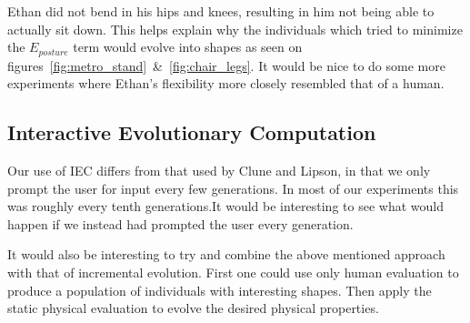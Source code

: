 Ethan did not bend in his hips and knees, resulting in him not being able to 
actually sit down. This helps explain why the individuals which tried to 
minimize the $E_{posture}$ term would evolve into shapes as seen on
figures~\ref{fig:metro_stand}~\&~\ref{fig:chair_legs}. It would be nice to do 
some more experiments where Ethan's flexibility more closely resembled that of 
a human.

\subsection{Interactive Evolutionary Computation}
Our use of IEC differs from that used by Clune and 
Lipson\cite{Clune:2011:EOG:2078245.2078246}, in that we only prompt the user 
for input every few generations. In most of our experiments this was roughly 
every tenth generations.It would be interesting to see what would happen if we 
instead had prompted the user every generation. 

It would also be interesting to try and combine the above mentioned approach 
with that of incremental evolution. First one could use only human evaluation 
to produce a population of individuals with interesting shapes. Then apply the 
static physical evaluation to evolve the desired physical properties.

